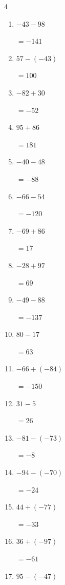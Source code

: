 \begin{multicols}{4}
\begin{enumerate}
        $=60$

\columnbreak %

  \item $-43-98$

        $=-141$

  \item $57-(-43)$

        $=100$

  \item $-82+30$

        $=-52$

  \item $95+86$

        $=181$

  \item $-40-48$

        $=-88$

  \item $-66-54$

        $=-120$

  \item $-69+86$

        $=17$

  \item $-28+97$

        $=69$

  \item $-49-88$

        $=-137$

  \item $80-17$

        $=63$

  \item $-66+(-84)$

        $=-150$

  \item $31-5$

        $=26$

  \item $-81-(-73)$

        $=-8$

  \item $-94-(-70)$

        $=-24$

  \item $44+(-77)$

        $=-33$

  \item $36+(-97)$

        $=-61$

  \item $95-(-47)$


\end{enumerate}
\end{multicols}
